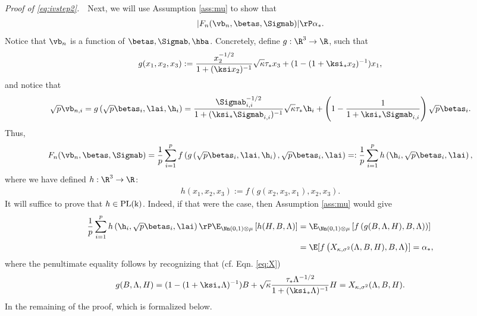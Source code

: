 \vspace{2pt}
\noindent\emph{Proof of \eqref{eq:ivstep2}.}~~Next, we will use Assumption \ref{ass:mu} to show that 
\begin{align}
|F_n(\vb_n,\betas,\Sigmab)| \rP \alpha_*.\label{eq:AO_conv}
\end{align}
Notice that $\vb_n$ is a function of $\betas,\Sigmab,\hba$. Concretely, define $g:\R^3\rightarrow\R$, such that
$$
g(x_1,x_2,x_3) := \frac{x_2^{-1/2}}{1+(\ksi x_2)^{-1}}\sqrt{\kappa}\tau_* x_3 + (1-(1+\ksi_*x_2)^{-1})x_1,
$$
and notice that
$$
\sqrt{p}\vb_{n,i} = g\left(\sqrt{p}\betas_i,\lai,\h_i\right) = \frac{{\Sigmab_{i,i}^{-1/2}}}{1+(\ksi_*\Sigmab_{i,i})^{-1}}\sqrt{\kappa}\tau_*\h_i +\left(1-\frac{1}{1+\ksi_*\Sigmab_{i,i}}\right)\sqrt{p}\betas_i.
$$
Thus,
$$
F_n(\vb_n,\betas,\Sigmab) = \frac{1}{p}\sum_{i=1}^p f\left(g\left(\sqrt{p}\betas_i,\lai,\h_i\right),\sqrt{p}\betas_i,\lai\right) =: \frac{1}{p}\sum_{i=1}^p h\left(\h_i,\sqrt{p}\betas_i,\lai\right),
$$
where we have defined $h:\R^3\rightarrow\R$:
\begin{align}
h(x_1,x_2,x_3) := f\left(g(x_2,x_3,x_1),x_2,x_3\right).\label{h func}
\end{align}
It will suffice to prove that $h\in\rm{PL}(k)$. Indeed, if that were the case, then Assumption \ref{ass:mu} would give
\begin{align}
\frac{1}{p}\sum_{i=1}^p h\left(\h_i,\sqrt{p}\betas_i,\lai\right) \rP \E_{\Nn(0,1)\otimes \mu}\left[h(H,B,\Lambda)\right] &=  \E_{\Nn(0,1)\otimes \mu}\left[f\left(g(B,\Lambda,H),B,\Lambda\right))\right]\\
& = \E[f\left(X_{\kappa,\sigma^2}(\Lambda,B,H),B,\Lambda\right)] = \alpha_*,
\end{align}
where the penultimate equality follows by recognizing that (cf. Eqn. \eqref{eq:X})
$$
g(B,\Lambda,H) = (1-(1+\ksi_*\Lambda)^{-1})B + \sqrt{\kappa}\frac{\tau_*\Lambda^{-1/2}}{1+(\ksi_*\Lambda)^{-1}}H =  X_{\kappa,\sigma^2}(\Lambda,B,H).
$$
In the remaining of the proof,  which is formalized below.

